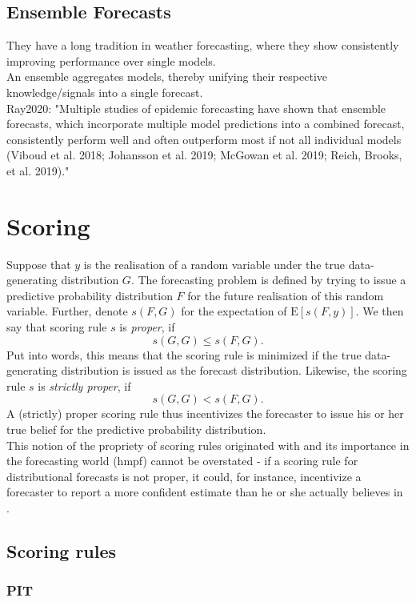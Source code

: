 \subsection{Ensemble Forecasts}
They have a long tradition in weather forecasting, where they show consistently improving performance over single models. \\
An ensemble aggregates models, thereby unifying their respective knowledge/signals into a single forecast.\\
Ray2020: "Multiple studies of epidemic forecasting have shown that ensemble forecasts, which incorporate multiple model predictions into a combined forecast, consistently perform well and often outperform most if not all individual models (Viboud et al. 2018; Johansson et al. 2019; McGowan et al. 2019; Reich, Brooks, et al. 2019)."
\section{Scoring}
Suppose that $y$ is the realisation of a random variable under the true data-generating distribution $G$. The forecasting problem is defined by trying to issue a predictive probability distribution $F$ for the future realisation of this random variable. Further, denote $s(F,G)$ for the expectation of $\text{E}[s(F,y)]$. We then say that scoring rule $s$ is \textit{proper}, if 
\[s(G,G) \leq s(F,G).\]
Put into words, this means that the scoring rule is minimized if the true data-generating distribution is issued as the forecast distribution. Likewise, the scoring rule $s$ is \textit{strictly proper}, if 
\[s(G,G) < s(F,G).\] 
A (strictly) proper scoring rule thus incentivizes the forecaster to issue his or her true belief for the predictive probability distribution.\\
This notion of the propriety of scoring rules originated with  and its importance in the forecasting world (hmpf) cannot be overstated - if a scoring rule for distributional forecasts is not proper, it could, for instance, incentivize a forecaster to report a more confident estimate than he or she actually believes in . \\
\subsection{Scoring rules}
\subsubsection{PIT}
